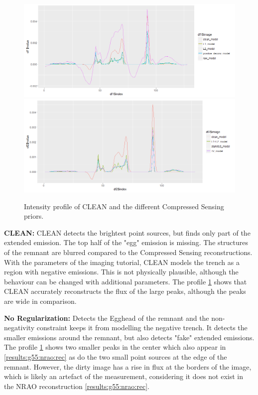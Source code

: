 \begin{figure}
	\includegraphics[width=\linewidth, clip]{./chapters/05.results/tmp0.png}
	\includegraphics[width=\linewidth, clip]{./chapters/05.results/tmp1.png}
	\caption{Intensity profile of CLEAN and the different Compressed Sensing priors.}
	\label{res:g55:profile}
\end{figure}

\textbf{CLEAN:} CLEAN detects the brightest point sources, but finds only part of the extended emission. The top half of the "egg" emission is missing. The structures of the remnant are blurred compared to the Compressed Sensing reconstructions. With the parameters of the imaging tutorial, CLEAN models the trench as a region with negative emissions. This is not physically plausible, although the behaviour can be changed with additional parameters. The profile \ref{res:g55:profile} shows that CLEAN accurately reconstructs the flux of the large peaks, although the peaks are wide in comparison.

\textbf{No Regularization:} Detects the Egghead of the remnant and the non-negativity constraint keeps it from modelling the negative trench. It detects the smaller emissions around the remnant, but also detects "fake" extended emissions. The profile \ref{res:g55:profile}  shows two smaller peaks in the center which also appear in \ref{results:g55:nrao:rec} as do the two small point sources at the edge of the remnant. However, the dirty image has a rise in flux at the borders of the image, which is likely an artefact of the measurement, considering it does not exist in the NRAO reconstruction \ref{results:g55:nrao:rec}.


